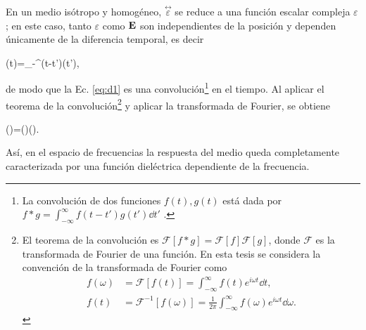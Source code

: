 En un medio isótropo y homogéneo, $\stackrel{\leftrightarrow}{\varepsilon}$ se reduce a una función escalar compleja $\varepsilon$ \cite{jacksonClassicalElectrodynamics2021a}; en este caso, tanto $\varepsilon$ como $\vb{E}$ son independientes de la posición y dependen únicamente de la diferencia temporal, es decir \cite{jacksonClassicalElectrodynamics2021a}
%
\begin{tcolorbox}
	(t)=\int_{-\infty}^{\infty}\varepsilon(t-t')(t'),
	\label{eq:d1} 
\end{tcolorbox}
%	
\noindent de modo que la Ec. \eqref{eq:d1} es una convolución\footnote{La convolución de dos funciones $f(t), g(t)$ está dada por $f\ast g=\int_{-\infty}^{\infty}f(t-t')g(t')\dd{t'}$ \cite{arfkenMathematicalMethodsPhysicists2011a}.} en el tiempo. Al aplicar el teorema de la convolución\footnote{El teorema de la convolución es $\mathscr{F}[f\ast g]=\mathscr{F}[f]\mathscr{F}[g]$, donde $\mathscr{F}$ es la transformada de Fourier de una función. En esta tesis se considera la convención de la transformada de Fourier como \cite{arfkenMathematicalMethodsPhysicists2011a}
	\begin{align*}
		 f(\omega)&=\mathscr{F}[f(t)]=\int_{-\infty}^{\infty}f(t)e^{i\omega t}\dd{t},\\ f(t)&=\mathscr{F}^{-1}[f(\omega)]=\frac{1}{2\pi}\int_{-\infty}^{\infty}f(\omega)e^{i\omega t}\dd{\omega}.
	\end{align*}}
 y aplicar la transformada de Fourier, se obtiene \cite{bohrenAbsorptionScatteringLight2008}
%
\begin{tcolorbox}
		(\omega)=\varepsilon(\omega)(\omega).
	\label{eq:d3} 
\end{tcolorbox}
%	
\noindent Así, en el espacio de frecuencias la respuesta del medio queda completamente caracterizada por una función dieléctrica dependiente de la frecuencia.

